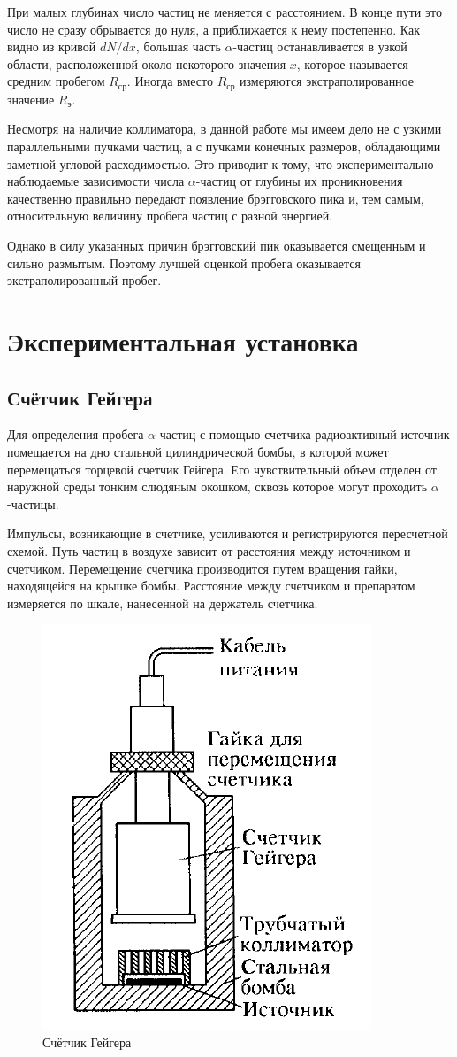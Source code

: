 \documentclass[a4paper, 12pt]{article}%
\begin{document}
    При малых глубинах число частиц не меняется с расстоянием. В конце пути это число не сразу обрывается до нуля, а приближается к нему постепенно. Как видно из кривой $dN/dx$, большая часть $\alpha$-частиц останавливается в узкой области, расположенной около некоторого значения $x$, которое называется средним пробегом $R_{\text{ср}}$. Иногда вместо $R_{\text{ср}}$ измеряются экстраполированное значение $R_{\text{э}}$.

    Несмотря на наличие коллиматора, в данной работе мы имеем дело не с узкими параллельными пучками частиц, а с пучками конечных размеров, обладающими заметной угловой расходимостью. Это приводит к тому, что экспериментально наблюдаемые зависимости числа $\alpha$-частиц от глубины их проникновения качественно правильно передают появление брэгговского пика и, тем самым, относительную величину пробега частиц с разной энергией. 
    
    Однако в силу указанных причин брэгговский пик оказывается смещенным и сильно размытым.
    Поэтому лучшей оценкой пробега оказывается экстраполированный пробег.

\section{Экспериментальная установка}
\subsection{Счётчик Гейгера}

    Для определения пробега $\alpha$-частиц с помощью счетчика радиоактивный источник помещается на дно стальной цилиндрической бомбы, в которой может перемещаться торцевой счетчик Гейгера. Его чувствительный объем отделен от наружной среды тонким слюдяным
    окошком, сквозь которое могут проходить $\alpha$-частицы.


    Импульсы, возникающие в счетчике, усиливаются и регистрируются пересчетной схемой. Путь частиц в воздухе зависит от расстояния
    между источником и счетчиком. Перемещение счетчика производится путем вращения гайки, находящейся на крышке бомбы. Расстояние
    между счетчиком и препаратом измеряется по шкале, нанесенной на держатель счетчика.

    \begin{figure}[h!]
        \centering
        \includegraphics[width = 6 cm]{pic2.png}
        \caption{Счётчик Гейгера}
        \label{}
    \end{figure}
\end{document}
